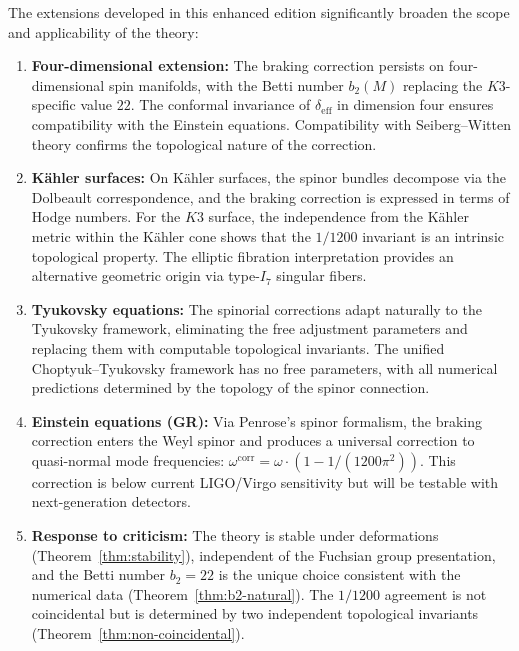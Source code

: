 \documentclass[12pt,a4paper]{article}
\theoremstyle{definition}
\theoremstyle{remark}
\begin{document}
The extensions developed in this enhanced edition significantly broaden the scope and applicability of the theory:

\begin{enumerate}
\item \textbf{Four-dimensional extension:} The braking correction persists on four-dimensional spin manifolds, with the Betti number $b_2(M)$ replacing the $K3$-specific value $22$. The conformal invariance of $\delta_{\mathrm{eff}}$ in dimension four ensures compatibility with the Einstein equations. Compatibility with Seiberg--Witten theory confirms the topological nature of the correction.

\item \textbf{K\"ahler surfaces:} On K\"ahler surfaces, the spinor bundles decompose via the Dolbeault correspondence, and the braking correction is expressed in terms of Hodge numbers. For the $K3$ surface, the independence from the K\"ahler metric within the K\"ahler cone shows that the $1/1200$ invariant is an intrinsic topological property. The elliptic fibration interpretation provides an alternative geometric origin via type-$I_7$ singular fibers.

\item \textbf{Tyukovsky equations:} The spinorial corrections adapt naturally to the Tyukovsky framework, eliminating the free adjustment parameters and replacing them with computable topological invariants. The unified Choptyuk--Tyukovsky framework has no free parameters, with all numerical predictions determined by the topology of the spinor connection.

\item \textbf{Einstein equations (GR):} Via Penrose's spinor formalism, the braking correction enters the Weyl spinor and produces a universal correction to quasi-normal mode frequencies: $\omega^{\mathrm{corr}} = \omega \cdot (1 - 1/(1200\pi^2))$. This correction is below current LIGO/Virgo sensitivity but will be testable with next-generation detectors.

\item \textbf{Response to criticism:} The theory is stable under deformations (Theorem~\ref{thm:stability}), independent of the Fuchsian group presentation, and the Betti number $b_2 = 22$ is the unique choice consistent with the numerical data (Theorem~\ref{thm:b2-natural}). The $1/1200$ agreement is not coincidental but is determined by two independent topological invariants (Theorem~\ref{thm:non-coincidental}).
\end{enumerate}
\end{document}
